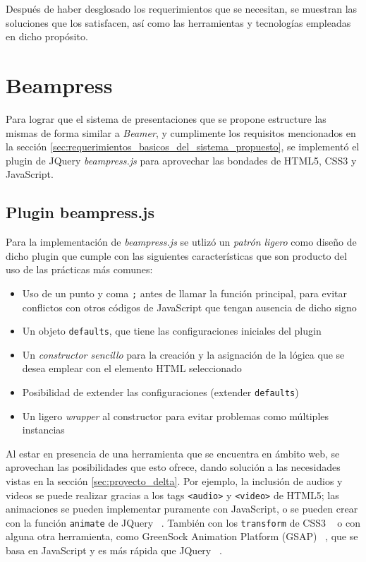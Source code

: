 	Después de haber desglosado los requerimientos que se necesitan, se muestran las soluciones que los satisfacen, así como las herramientas y tecnologías empleadas en dicho propósito. 

	\section{Beampress} %
	\label{sec:beampress}
		Para lograr que el sistema de presentaciones que se propone estructure las mismas de forma similar a \textit{Beamer}, y cumplimente los requisitos mencionados en la sección \ref{sec:requerimientos_basicos_del_sistema_propuesto}, se implementó el plugin de JQuery \textit{beampress.js} para aprovechar las bondades de HTML5, CSS3 y JavaScript.

		\subsection{Plugin beampress.js} %
		\label{sub:beampress_js}
			 Para la implementación de \textit{beampress.js} se utlizó un  \textit{patrón ligero} como diseño de dicho plugin \cite{smashingmagazine} que cumple con las siguientes características que son producto del uso de las prácticas más comunes:

			\begin{itemize}
				\item Uso de un punto y coma \texttt{;} antes de llamar la función principal, para evitar conflictos con otros códigos de JavaScript que tengan ausencia de dicho signo
				\item Un objeto \texttt{defaults}, que tiene las configuraciones iniciales del plugin
				\item Un \textit{constructor sencillo} para la creación y la asignación de la lógica que se desea emplear con el elemento HTML seleccionado
				\item Posibilidad de extender las configuraciones (extender \texttt{defaults})
				\item Un ligero \textit{wrapper} al constructor para evitar problemas como múltiples instancias
			\end{itemize}		


		Al estar en presencia de una herramienta que se encuentra en ámbito web, se aprovechan las posibilidades que esto ofrece, dando solución a las necesidades vistas en la sección \ref{sec:proyecto_delta}. Por ejemplo, la inclusión de audios y videos se puede realizar gracias a los tags \texttt{<audio>} y \texttt{<video>} de HTML5; las animaciones se pueden implementar puramente con JavaScript, o se pueden crear con la función \texttt{animate} de JQuery ~\cite{jquery}. También con los \texttt{transform} de CSS3 ~\cite{csstransform} o con alguna otra herramienta, como GreenSock Animation Platform (GSAP) ~\cite{gsap}, que se basa en JavaScript y es más rápida que JQuery ~\cite{jquery}. 


